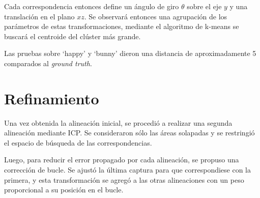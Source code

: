 	Cada correspondencia entonces define un ángulo de giro $\theta$ sobre el
	eje $y$ y una translación en el plano $xz$.
	Se observará entonces una agrupación de los parámetros de estas
	transformaciones, mediante el algoritmo de k-means se buscará el centroide
	del clúster más grande.

	Las pruebas sobre `happy' y `bunny' dieron una distancia de aproximadamente
	5 %
	comparados al \emph{ground truth}.


	\section{Refinamiento}
	Una vez obtenida la alineación inicial, se procedió a realizar una segunda
	alineación mediante ICP.
	Se consideraron sólo las áreas solapadas y se restringió el
	espacio de búsqueda de las correspondencias.

	Luego, para reducir el error propagado por cada alineación, se propuso una
	corrección de bucle.
	Se ajustó la última captura para que correspondiese con la primera, y
	esta transformación se agregó a las otras alineaciones con un peso
	proporcional a su posición en el bucle.
